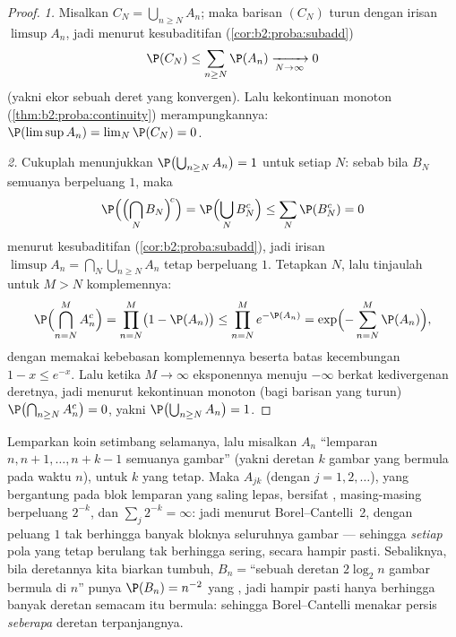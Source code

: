 \begin{proof}
\emph{1.} Misalkan $C_N = \bigcup_{n \geq N}A_n$; maka barisan $(C_N)$
turun dengan irisan $\limsup A_n$, jadi menurut kesubaditifan
 (\cref{cor:b2:proba:subadd})
\[
\P(C_N) \leq \sum_{n \geq N}\P(A_n)
\xrightarrow[N\to\infty]{} 0
\]
(yakni ekor sebuah deret yang konvergen). Lalu kekontinuan monoton
(\cref{thm:b2:proba:continuity}) merampungkannya: $\P(\limsup A_n) =
\lim_N \P(C_N) = 0$.

\emph{2.} Cukuplah menunjukkan $\P\bigl(\bigcup_{n\geq N}A_n\bigr)
= 1$ untuk setiap $N$: sebab bila  $B_N$ semuanya berpeluang
$1$, maka
\[
\P\Bigl(\Bigl(\bigcap_NB_N\Bigr)^{\!c}\Bigr)
= \P\Bigl(\bigcup_NB_N^c\Bigr)
\leq \sum_N\P(B_N^c) = 0
\]
menurut kesubaditifan 
(\cref{cor:b2:proba:subadd}), jadi irisan 
$\limsup A_n = \bigcap_N\bigcup_{n\geq N}A_n$ tetap berpeluang
$1$. Tetapkan $N$, lalu tinjaulah untuk $M > N$
komplemennya:
\[
\P\Bigl(\bigcap_{n=N}^{M} A_n^c\Bigr)
= \prod_{n=N}^{M}\bigl(1 - \P(A_n)\bigr)
\leq \prod_{n=N}^{M} e^{-\P(A_n)}
= \exp\Bigl(-\sum_{n=N}^M \P(A_n)\Bigr) ,
\]
dengan memakai kebebasan komplemennya beserta batas kecembungan $1 -
x \leq e^{-x}$. Lalu ketika $M \to \infty$ eksponennya menuju $-\infty$
berkat kedivergenan deretnya, jadi menurut kekontinuan monoton
(bagi barisan yang turun) $\P\bigl(\bigcap_{n \geq N}A_n^c\bigr) = 0$,
yakni $\P\bigl(\bigcup_{n \geq N}A_n\bigr) = 1$.
\end{proof}

\begin{example}\label{ex:b2:proba:runs}
Lemparkan koin setimbang selamanya, lalu misalkan $A_n$  ``lemparan $n,
n+1, \dots, n + k - 1$ semuanya gambar'' (yakni deretan $k$ gambar
yang bermula pada waktu $n$), untuk $k$ yang tetap. Maka  $A_{jk}$ (dengan $j =
1, 2, \dots$), yang bergantung pada blok lemparan yang saling lepas, bersifat
, masing-masing berpeluang $2^{-k}$, dan $\sum_j 2^{-k} =
\infty$: jadi menurut Borel--Cantelli~2, dengan peluang $1$ tak berhingga
banyak bloknya seluruhnya gambar --- sehingga \emph{setiap} pola yang tetap berulang
tak berhingga sering, secara hampir pasti. Sebaliknya, bila  deretannya
kita biarkan tumbuh, $B_n = {}$``sebuah deretan $2\log_2 n$ gambar bermula di
$n$'' punya $\P(B_n) = n^{-2}$ yang , jadi hampir pasti hanya
berhingga banyak deretan  semacam itu bermula: sehingga Borel--Cantelli menakar
persis \emph{seberapa } deretan terpanjangnya.
\end{example}

